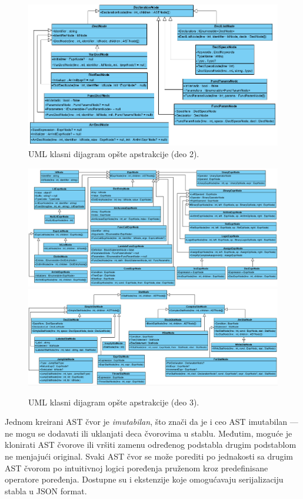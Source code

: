 \begin{figure}[h!]
\centering
\includegraphics[scale=0.7]{images/uml/DeclarationNode.png}
\caption{UML klasni dijagram opšte apstrakcije (deo 2).}
\label{fig:UMLASTNode2}
\end{figure}

\begin{figure}[h!]
\centering
\includegraphics[scale=0.55]{images/uml/ExpressionNode.png}
\includegraphics[scale=0.55]{images/uml/StatementNode.png}
\caption{UML klasni dijagram opšte apstrakcije (deo 3).}
\label{fig:UMLASTNode3}
\end{figure}

Jednom kreirani AST čvor je \emph{imutabilan}, što znači da je i ceo AST imutabilan --- ne mogu se dodavati ili uklanjati deca čvorovima u stablu. Međutim, moguće je klonirati AST čvorove ili vršiti zamenu određenog podstabla drugim podstablom ne menjajući original. Svaki AST čvor se može porediti po jednakosti sa drugim AST čvorom po intuitivnoj logici poređenja pruženom kroz predefinisane operatore poređenja. Dostupne su i ekstenzije koje omogućavaju serijalizaciju stabla u JSON format.

